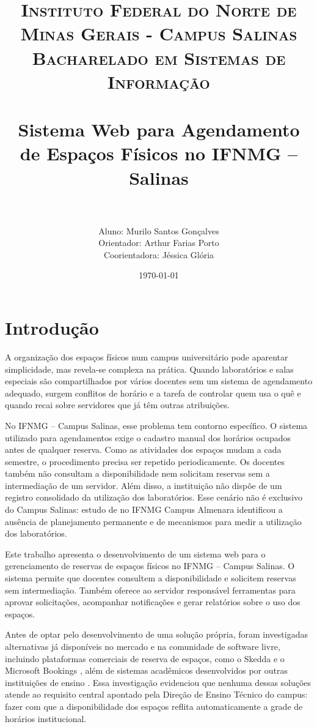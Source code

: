 \documentclass[
	12pt,				%
	twoside,			%
	openany,			%
	a4paper,			%
	chapter=TITLE,		%
	section=TITLE,		%
	subsection=TITLE,	%
	subsubsection=TITLE,%
	english,			%
	french,				%
	spanish,			%
	brazil,				%
	]{abntex2}
\title{
\normalfont \normalsize
\textsc{Instituto Federal do Norte de Minas Gerais - Campus Salinas\\
        Bacharelado em Sistemas de Informação\\
        }
\horrule{2pt} \\[0.4cm]
\huge
        Sistema Web para Agendamento de Espaços Físicos no IFNMG -- Salinas \\
\horrule{2pt} \\[25pt]
}
\author{Aluno: Murilo Santos Gonçalves \\
[3mm]Orientador: Arthur Farias Porto\\
[3mm]Coorientadora: Jéssica Glória\\
}
\date{\normalsize\today}
\begin{document}
\frenchspacing
\maketitle
\thispagestyle{empty}   %

\clearpage              %
\setcounter{page}{1}    %
\section{Introdução}
\label{Introducao}
A organização dos espaços físicos num campus universitário pode aparentar simplicidade, mas revela-se complexa na prática. Quando laboratórios e salas especiais são compartilhados por vários docentes sem um sistema de agendamento adequado, surgem conflitos de horário e a tarefa de controlar quem usa o quê e quando recai sobre servidores que já têm outras atribuições.

No IFNMG -- Campus Salinas, esse problema tem contorno específico. O sistema utilizado para agendamentos exige o cadastro manual dos horários ocupados antes de qualquer reserva. Como as atividades dos espaços mudam a cada semestre, o procedimento precisa ser repetido periodicamente. Os docentes também não consultam a disponibilidade nem solicitam reservas sem a intermediação de um servidor. Além disso, a instituição não dispõe de um registro consolidado da utilização dos laboratórios. Esse cenário não é exclusivo do Campus Salinas: estudo de  no IFNMG Campus Almenara identificou a ausência de planejamento permanente e de mecanismos para medir a utilização dos laboratórios.

Este trabalho apresenta o desenvolvimento de um sistema web para o gerenciamento de reservas de espaços físicos no IFNMG -- Campus Salinas. O sistema permite que docentes consultem a disponibilidade e solicitem reservas sem intermediação. Também oferece ao servidor responsável ferramentas para aprovar solicitações, acompanhar notificações e gerar relatórios sobre o uso dos espaços.

Antes de optar pelo desenvolvimento de uma solução própria, foram investigadas alternativas já disponíveis no mercado e na comunidade de software livre, incluindo plataformas comerciais de reserva de espaços, como o Skedda \cite{skedda2025} e o Microsoft Bookings \cite{microsoft2025bookings}, além de sistemas acadêmicos desenvolvidos por outras instituições de ensino \cite{cruz2023gestao,nascimento2020reservas}. Essa investigação evidenciou que nenhuma dessas soluções atende ao requisito central apontado pela Direção de Ensino Técnico do campus: fazer com que a disponibilidade dos espaços reflita automaticamente a grade de horários institucional.
\end{document}
